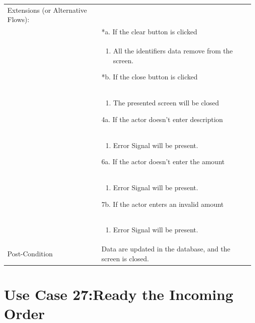 \documentclass[12pt,a4paper]{article}
\begin{document}
\begin{longtable}{| p{3cm}|p{12cm}|}
Extensions (or Alternative Flows):\\
& *a. If the clear button is clicked \\
& \begin{enumerate}
		\item All the identifiers data remove from the screen.
	\end{enumerate}
*b. If the close button is clicked\\
&	\begin{enumerate}
		\item The presented screen will be closed
	\end{enumerate}
4a. If the actor doesn't enter description \\ 	
&	\begin{enumerate}
		\item Error Signal will be present.
	\end{enumerate}
6a. If the actor doesn't enter the amount\\ 	
&	\begin{enumerate}
		\item Error Signal will be present.
	\end{enumerate}
7b. If the actor enters an invalid amount\\ 	
&	\begin{enumerate}
		\item Error Signal will be present.
	\end{enumerate}
\\ \hline
Post-Condition & Data are updated in the database, and the screen is closed.  \\\hline
\end{longtable}

\section*{Use Case 27:Ready the Incoming Order}
\end{document}
